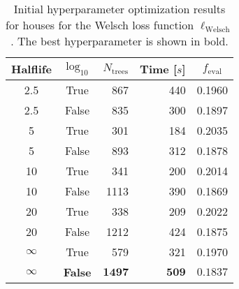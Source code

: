 \begin{table}[h!]
  \begin{tabular}{@{}ccrrc@{}}
    Halflife & $\log_{10}$ & $N_\mathrm{trees}$ & Time [$s$] & $f_\mathrm{eval}$ \\
    \midrule
    \num{2.5} & True & \num{867} & \num{440} & \num{0.1960} \\
    \num{2.5} & False & \num{835} & \num{300} & \num{0.1897} \\
    \num{5} & True & \num{301} & \num{184} & \num{0.2035} \\
    \num{5} & False & \num{893} & \num{312} & \num{0.1878} \\
    \num{10} & True & \num{341} & \num{200} & \num{0.2014} \\
    \num{10} & False & \num{1113} & \num{390} & \num{0.1869} \\
    \num{20} & True & \num{338} & \num{209} & \num{0.2022} \\
    \num{20} & False & \num{1212} & \num{424} & \num{0.1875} \\
    $\infty$ & True & \num{579} & \num{321} & \num{0.1970} \\
    $\bm{\infty}$ & \textbf{False} & $\mathbf{1497}$ & $\mathbf{509}$ & $\mathbf{0.1837}$ \\
  \end{tabular}
  \caption[Initial Hyperparameter Optimization Results for Houses -- Welsch Loss Function]{\label{tab:h:HPO_initial_Welsch-villa-appendix}Initial hyperparameter optimization results for houses for the Welsch loss function $\ell_\mathrm{Welsch}$. The best hyperparameter is shown in bold.}
\end{table}


